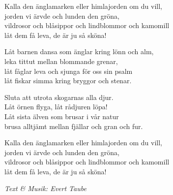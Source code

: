 \vspace{10pt}
Kalla den änglamarken eller himlajorden om du vill,\\
jorden vi ärvde och lunden den gröna,\\
vildrosor och blåsippor och lindblommor och kamomill\\
låt dem få leva, de är ju så sköna!\par
\vspace{10pt}
Låt barnen dansa som änglar kring lönn och alm,\\
leka tittut mellan blommande grenar,\\
låt fåglar leva och sjunga för oss sin psalm\\
låt fiskar simma kring bryggor och stenar.\par
\vspace{10pt}
Sluta att utrota skogarnas alla djur.\\
Låt örnen flyga, låt rådjuren löpa!\\
Låt sista älven som brusar i vår natur\\
brusa alltjämt mellan fjällar och gran och fur.\par
\vspace{10pt}
Kalla den änglamarken eller himlajorden om du vill,\\
jorden vi ärvde och lunden den gröna,\\
vildrosor och blåsippor och lindblommor och kamomill\\
låt dem få leva, de är ju så sköna!\par
\vspace{10pt}
{\footnotesize\textit{Text \& Musik: Evert Taube}}

